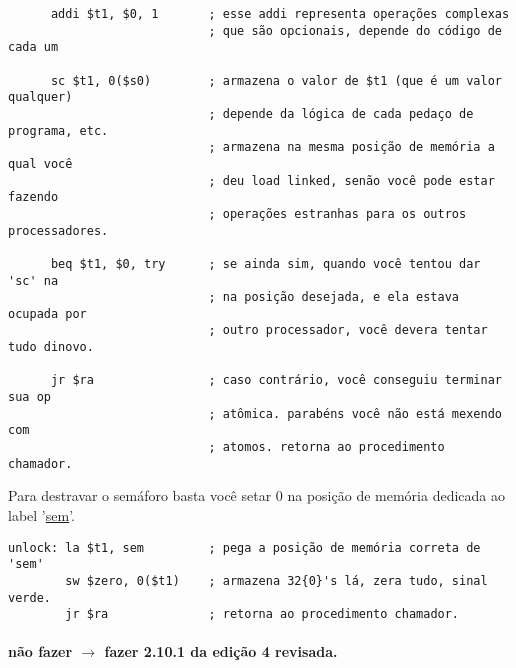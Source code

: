 \documentclass{article}
\begin{document}
\begin{enumerate}
\begin{verbatim}
      addi $t1, $0, 1       ; esse addi representa operações complexas
                            ; que são opcionais, depende do código de cada um

      sc $t1, 0($s0)        ; armazena o valor de $t1 (que é um valor qualquer)
                            ; depende da lógica de cada pedaço de programa, etc.
                            ; armazena na mesma posição de memória a qual você
                            ; deu load linked, senão você pode estar fazendo
                            ; operações estranhas para os outros processadores.

      beq $t1, $0, try      ; se ainda sim, quando você tentou dar 'sc' na
                            ; na posição desejada, e ela estava ocupada por
                            ; outro processador, você devera tentar tudo dinovo.

      jr $ra                ; caso contrário, você conseguiu terminar sua op
                            ; atômica. parabéns você não está mexendo com
                            ; atomos. retorna ao procedimento chamador.
\end{verbatim}

Para destravar o semáforo basta você setar 0 na posição de memória dedicada ao 
label '\underline{sem}'.

\begin{verbatim}
unlock: la $t1, sem         ; pega a posição de memória correta de 'sem'
        sw $zero, 0($t1)    ; armazena 32{0}'s lá, zera tudo, sinal verde.
        jr $ra              ; retorna ao procedimento chamador.
\end{verbatim}

\end{enumerate}

\paragraph{não fazer  $\rightarrow$ fazer 2.10.1 da edição 4 
revisada.}
\end{document}
